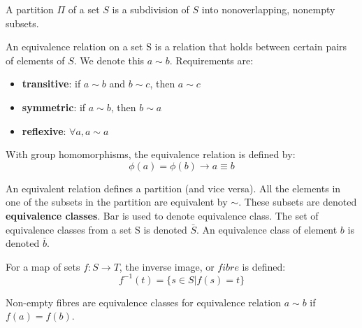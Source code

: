 \begin{definition}
  A partition $\Pi$ of a set $S$ is a subdivision of $S$ into nonoverlapping,
  nonempty subsets.
\end{definition}

\begin{definition}
  An equivalence relation on a set S is a relation that holds between certain
  pairs of elements of $S$. We denote this $a \sim b$. Requirements are:
  \begin{itemize}
      \item \textbf{transitive}: if $a \sim b$ and $b \sim c$, then $a \sim c$
      \item \textbf{symmetric}: if $a \sim b$, then $b \sim a$
      \item \textbf{reflexive}: $\forall a, a \sim a$
  \end{itemize}

  With group homomorphisms, the equivalence relation is defined by:
  \[\phi(a) = \phi(b) \rightarrow a \equiv b\]

\end{definition}

\begin{definition}

  An equivalent relation defines a partition (and vice versa). All the elements
  in one of the subsets in the partition are equivalent by $\sim$. These subsets
  are denoted \textbf{equivalence classes}. Bar is used to denote equivalence
  class. The set of equivalence classes from a set S is denoted $\bar{S}$. An
  equivalence class of element $b$ is denoted $\bar{b}$.

\end{definition}


\begin{definition}

  For a map of sets $f:S \rightarrow T$, the inverse image, or $fibre$ is defined:
  \[f^{-1}(t) = \{s \in S | f(s) = t\}\]

  Non-empty fibres are equivalence classes for equivalence relation
  $a \sim b $ if $f(a) = f(b)$.

\end{definition}

